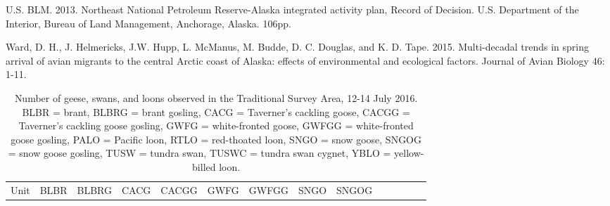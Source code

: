 \documentclass[]{article}
\begin{document}
U.S. BLM. 2013. Northeast National Petroleum Reserve-Alaska integrated
activity plan, Record of Decision. U.S. Department of the Interior,
Bureau of Land Management, Anchorage, Alaska. 106pp.

Ward, D. H., J. Helmericks, J.W. Hupp, L. McManus, M. Budde, D. C.
Douglas, and K. D. Tape. 2015. Multi-decadal trends in spring arrival of
avian migrants to the central Arctic coast of Alaska: effects of
environmental and ecological factors. Journal of Avian Biology 46: 1-11.
\newpage
\footnotesize
{%
\begin{longtable}[]{@{}rrrrrrrrrrrrrr@{}}
\caption{Number of geese, swans, and loons observed in the Traditional
Survey Area, 12-14 July 2016. BLBR = brant, BLBRG = brant gosling, CACG
= Taverner's cackling goose, CACGG = Taverner's cackling goose gosling,
GWFG = white-fronted goose, GWFGG = white-fronted goose gosling, PALO =
Pacific loon, RTLO = red-thoated loon, SNGO = snow goose, SNGOG = snow
goose gosling, TUSW = tundra swan, TUSWC = tundra swan cygnet, YBLO =
yellow-billed loon.}\tabularnewline
\toprule
\begin{minipage}[b]{0.05\columnwidth}\raggedleft\strut
Unit\strut
\end{minipage} & \begin{minipage}[b]{0.05\columnwidth}\raggedleft\strut
BLBR\strut
\end{minipage} & \begin{minipage}[b]{0.05\columnwidth}\raggedleft\strut
BLBRG\strut
\end{minipage} & \begin{minipage}[b]{0.05\columnwidth}\raggedleft\strut
CACG\strut
\end{minipage} & \begin{minipage}[b]{0.05\columnwidth}\raggedleft\strut
CACGG\strut
\end{minipage} & \begin{minipage}[b]{0.05\columnwidth}\raggedleft\strut
GWFG\strut
\end{minipage} & \begin{minipage}[b]{0.05\columnwidth}\raggedleft\strut
GWFGG\strut
\end{minipage} & \begin{minipage}[b]{0.04\columnwidth}\raggedleft\strut
SNGO\strut
\end{minipage} & \begin{minipage}[b]{0.05\columnwidth}\raggedleft\strut
SNGOG\strut
\end{minipage} & \begin{minipage}[b]{0.04\columnwidth}\raggedleft\strut

\end{minipage}
\end{longtable}}
\end{document}
